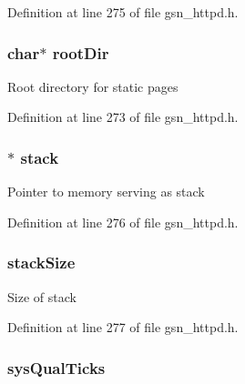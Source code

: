 Definition at line 275 of file gsn\_\-httpd.h.

\hypertarget{a00095_a8479521b0f87848099a96a1227c893b2}{
\subsubsection[{rootDir}]{\setlength{\rightskip}{0pt plus 5cm}char$\ast$ {\bf rootDir}}}
\label{a00095_a8479521b0f87848099a96a1227c893b2}
Root directory for static pages 

Definition at line 273 of file gsn\_\-httpd.h.

\hypertarget{a00095_afe48a70357b70eb2ce3f756fa87b9574}{
\subsubsection[{stack}]{$\ast$ {\bf stack}}}
\label{a00095_afe48a70357b70eb2ce3f756fa87b9574}
Pointer to memory serving as stack 

Definition at line 276 of file gsn\_\-httpd.h.

\hypertarget{a00095_a3c4efd56e4d6098acf4db4d2f68ab196}{
\subsubsection[{stackSize}]{ {\bf stackSize}}}
\label{a00095_a3c4efd56e4d6098acf4db4d2f68ab196}
Size of stack 

Definition at line 277 of file gsn\_\-httpd.h.

\hypertarget{a00095_a3b8eb219c70a5f7fc6dcb9d9643cbc31}{
\subsubsection[{sysQualTicks}]{ {\bf sysQualTicks}}}
\label{a00095_a3b8eb219c70a5f7fc6dcb9d9643cbc31}


